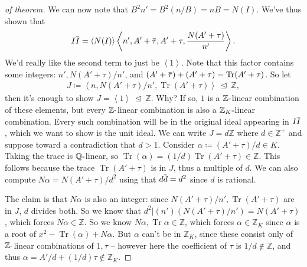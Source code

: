 \begin{proof}[of theorem]
We can now note that \(B^2 n' = B^2(n/B) = nB = N(I)\). We've thus shown
that
\begin{align*}
I \mkern 1.5mu\overline{\mkern-1.5muI\mkern-1.5mu}\mkern 1.5mu 
= \left\langle{ N(I) }\right\rangle 
\left\langle{ n', A' + \mkern 1.5mu\overline{\mkern-1.5mu \tau\mkern-1.5mu}\mkern 1.5mu , A' + \tau, { N(A' + \tau) \over  n'} }\right\rangle   
.\end{align*}
We'd really like the second term to just be
\(\left\langle{ 1 }\right\rangle\). Note that this factor contains some
integers: \(n', N(A' + \tau)/n'\), and
\((A' + \mkern 1.5mu\overline{\mkern-1.5mu\tau\mkern-1.5mu}\mkern 1.5mu) + (A' + \tau) = \operatorname{Tr}(A' + \tau)\).
So let
\begin{align*}
J \coloneqq\left\langle{ n, N(A' + \tau)/n', \operatorname{Tr}(A' + \tau) }\right\rangle {~\trianglelefteq~}{\mathbb{Z}}
,\end{align*}
then it's enough to show
\(J = \left\langle{ 1 }\right\rangle {~\trianglelefteq~}{\mathbb{Z}}\).
Why? If so, \(1\) is a \({\mathbb{Z}}{\hbox{-}}\)linear combination of
these elements, but every \({\mathbb{Z}}{\hbox{-}}\)linear combination
is also a \({\mathbb{Z}}_K{\hbox{-}}\)linear combination. Every such
combination will be in the original ideal appearing in
\(I \mkern 1.5mu\overline{\mkern-1.5muI\mkern-1.5mu}\mkern 1.5mu\),
which we want to show is the unit ideal. We can write
\(J = d{\mathbb{Z}}\) where \(d\in {\mathbb{Z}}^+\) and suppose toward a
contradiction that \(d>1\). Consider
\(\alpha \coloneqq(A' + \tau) / d \in K\). Taking the trace is
\({\mathbb{Q}}{\hbox{-}}\)linear, so
\(\operatorname{Tr}( \alpha) = (1/d) \operatorname{Tr}(A' + \tau) \in {\mathbb{Z}}\).
This follows because the trace \(\operatorname{Tr}(A' + \tau)\) is in
\(J\), thus a multiple of \(d\). We can also compute
\(N \alpha = N(A' + \tau) / d^2\) using that
\(d\mkern 1.5mu\overline{\mkern-1.5mud\mkern-1.5mu}\mkern 1.5mu = d^2\)
since \(d\) is rational.

The claim is that \(N \alpha\) is also an integer: since
\(N(A' + \tau)/n', \operatorname{Tr}(A' + \tau)\) are in \(J\), \(d\)
divides both. So we know that
\(d^2 \mathrel{\Big|}(n') (N(A' + \tau) / n') = N(A' + \tau)\), which
forces \(N \alpha\in {\mathbb{Z}}\). So we know
\(N \alpha, \operatorname{Tr}\alpha \in {\mathbb{Z}}\), which forces
\(\alpha\in {\mathbb{Z}}_K\) since \(\alpha\) is a root of
\(x^2 - \operatorname{Tr}(\alpha) + N \alpha\). But \(\alpha\) can't be
in \({\mathbb{Z}}_K\), since these consist only of
\({\mathbb{Z}}{\hbox{-}}\)linear combinations of \(1, \tau\) -- however
here the coefficient of \(\tau\) is \(1/d \not \in {\mathbb{Z}}\), and
thus \(\alpha = A'/d + (1/d) \tau \not\in {\mathbb{Z}}_K\).

\end{proof}

